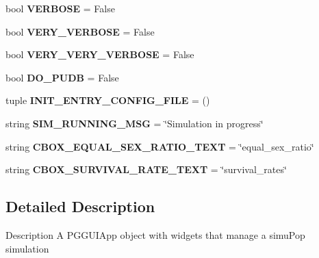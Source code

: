 \begin{DoxyCompactItemize}
\item 
bool {\bfseries V\+E\+R\+B\+O\+SE} = False\hypertarget{namespacenegui_1_1pgguisimupop_aab29eb6c6feb0d32b5d60b4eef930da9}{}\label{namespacenegui_1_1pgguisimupop_aab29eb6c6feb0d32b5d60b4eef930da9}

\item 
bool {\bfseries V\+E\+R\+Y\+\_\+\+V\+E\+R\+B\+O\+SE} = False\hypertarget{namespacenegui_1_1pgguisimupop_af283504b4edcb1ce9f987a021991a900}{}\label{namespacenegui_1_1pgguisimupop_af283504b4edcb1ce9f987a021991a900}

\item 
bool {\bfseries V\+E\+R\+Y\+\_\+\+V\+E\+R\+Y\+\_\+\+V\+E\+R\+B\+O\+SE} = False\hypertarget{namespacenegui_1_1pgguisimupop_a8108ea2476fc332bc23a302de1ca1bb4}{}\label{namespacenegui_1_1pgguisimupop_a8108ea2476fc332bc23a302de1ca1bb4}

\item 
bool {\bfseries D\+O\+\_\+\+P\+U\+DB} = False\hypertarget{namespacenegui_1_1pgguisimupop_a7828b4058072779ad8f76eaa79a87952}{}\label{namespacenegui_1_1pgguisimupop_a7828b4058072779ad8f76eaa79a87952}

\item 
tuple {\bfseries I\+N\+I\+T\+\_\+\+E\+N\+T\+R\+Y\+\_\+\+C\+O\+N\+F\+I\+G\+\_\+\+F\+I\+LE} = ()\hypertarget{namespacenegui_1_1pgguisimupop_a0c62f73e78dad26e648483936e298140}{}\label{namespacenegui_1_1pgguisimupop_a0c62f73e78dad26e648483936e298140}

\item 
string {\bfseries S\+I\+M\+\_\+\+R\+U\+N\+N\+I\+N\+G\+\_\+\+M\+SG} = \char`\"{}Simulation in progress\char`\"{}\hypertarget{namespacenegui_1_1pgguisimupop_a8a725ff5a5dd2af5a91501e7c7ab5cc7}{}\label{namespacenegui_1_1pgguisimupop_a8a725ff5a5dd2af5a91501e7c7ab5cc7}

\item 
string {\bfseries C\+B\+O\+X\+\_\+\+E\+Q\+U\+A\+L\+\_\+\+S\+E\+X\+\_\+\+R\+A\+T\+I\+O\+\_\+\+T\+E\+XT} = \char`\"{}equal\+\_\+sex\+\_\+ratio\char`\"{}\hypertarget{namespacenegui_1_1pgguisimupop_a1c01c30f2aa55cecaba7a0375fd5e72b}{}\label{namespacenegui_1_1pgguisimupop_a1c01c30f2aa55cecaba7a0375fd5e72b}

\item 
string {\bfseries C\+B\+O\+X\+\_\+\+S\+U\+R\+V\+I\+V\+A\+L\+\_\+\+R\+A\+T\+E\+\_\+\+T\+E\+XT} = \char`\"{}survival\+\_\+rates\char`\"{}\hypertarget{namespacenegui_1_1pgguisimupop_a5231b7a59f8bbc24c7108e20830b0643}{}\label{namespacenegui_1_1pgguisimupop_a5231b7a59f8bbc24c7108e20830b0643}

\end{DoxyCompactItemize}


\subsection{Detailed Description}
\begin{DoxyVerb}Description
A PGGUIApp object with widgets that manage a simuPop simulation
\end{DoxyVerb}
 